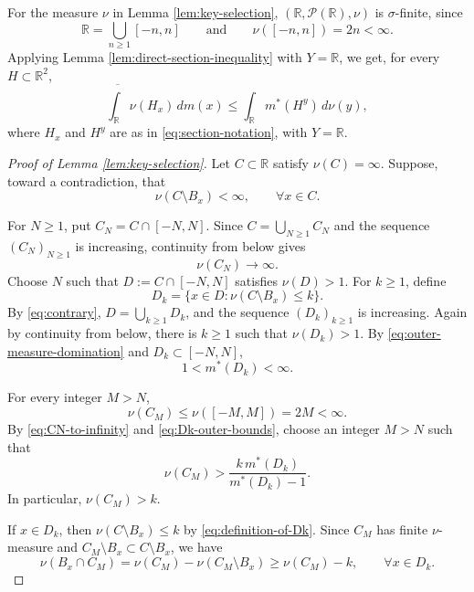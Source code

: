 \documentclass{amsart}
\theoremstyle{plain}
\theoremstyle{definition}
\newcommand{\R}{\mathbb{R}}
\newcommand{\Pc}{\mathcal{P}}
\begin{document}
For the measure $\nu$ in Lemma \ref{lem:key-selection}, $(\R,\Pc(\R),\nu)$ is $\sigma$-finite, since
\[
\R=\bigcup_{n\ge1}[-n,n]
\qquad\text{and}\qquad
\nu([-n,n])=2n<\infty.
\]
Applying Lemma \ref{lem:direct-section-inequality} with $Y=\R$, we get, for every $H\subset\R^2$,
\begin{equation}\label{eq:section-inequality}
\overline{\int_\R}\nu(H_x)\,dm(x)
\le
\int_\R m^*(H^y)\,d\nu(y),
\end{equation}
where $H_x$ and $H^y$ are as in \eqref{eq:section-notation}, with $Y=\R$.

\begin{proof}[Proof of Lemma \ref{lem:key-selection}]
Let $C\subset\R$ satisfy $\nu(C)=\infty$.
Suppose, toward a contradiction, that
\begin{equation}\label{eq:contrary}
\nu(C\setminus B_x)<\infty,
\qquad
\forall x\in C.
\end{equation}

For $N\ge1$, put $C_N=C\cap[-N,N]$.
Since $C=\bigcup_{N\ge1}C_N$ and the sequence $(C_N)_{N\ge1}$ is increasing, continuity from below gives
\begin{equation}\label{eq:CN-to-infinity}
\nu(C_N)\longrightarrow\infty.
\end{equation}
Choose $N$ such that $D:=C\cap[-N,N]$ satisfies $\nu(D)>1$.
For $k\ge1$, define
\begin{equation}\label{eq:definition-of-Dk}
D_k=\{x\in D:\nu(C\setminus B_x)\le k\}.
\end{equation}
By \eqref{eq:contrary}, $D=\bigcup_{k\ge1}D_k$, and the sequence $(D_k)_{k\ge1}$ is increasing.
Again by continuity from below, there is $k\ge1$ such that $\nu(D_k)>1$.
By \eqref{eq:outer-measure-domination} and $D_k\subset[-N,N]$,
\begin{equation}\label{eq:Dk-outer-bounds}
1<m^*(D_k)<\infty.
\end{equation}

For every integer $M>N$,
\[
\nu(C_M)\le\nu([-M,M])=2M<\infty.
\]
By \eqref{eq:CN-to-infinity} and \eqref{eq:Dk-outer-bounds}, choose an integer $M>N$ such that
\begin{equation}\label{eq:choice-of-M}
\nu(C_M)>\frac{k\,m^*(D_k)}{m^*(D_k)-1}.
\end{equation}
In particular, $\nu(C_M)>k$.

If $x\in D_k$, then $\nu(C\setminus B_x)\le k$ by \eqref{eq:definition-of-Dk}.
Since $C_M$ has finite $\nu$-measure and $C_M\setminus B_x\subset C\setminus B_x$, we have
\begin{equation}\label{eq:vertical-lower-section}
\nu(B_x\cap C_M)
=
\nu(C_M)-\nu(C_M\setminus B_x)
\ge
\nu(C_M)-k,
\qquad
\forall x\in D_k.
\end{equation}


\end{proof}
\end{document}
